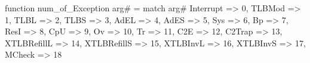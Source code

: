 function num_of_Exception arg# = match arg# {
  Interrupt => 0,
  TLBMod => 1,
  TLBL => 2,
  TLBS => 3,
  AdEL => 4,
  AdES => 5,
  Sys => 6,
  Bp => 7,
  ResI => 8,
  CpU => 9,
  Ov => 10,
  Tr => 11,
  C2E => 12,
  C2Trap => 13,
  XTLBRefillL => 14,
  XTLBRefillS => 15,
  XTLBInvL => 16,
  XTLBInvS => 17,
  MCheck => 18
}
